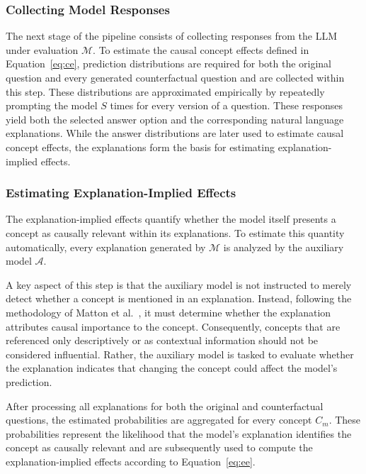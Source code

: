 \subsubsection{Collecting Model Responses}
\label{sec:collecting_model_responses}
The next stage of the pipeline consists of collecting responses from the LLM under evaluation $\mathcal{M}$. To estimate the causal concept effects defined in Equation~\ref{eq:ce}, prediction distributions are required for both the original question and every generated counterfactual question and are collected within this step. These distributions are approximated empirically by repeatedly prompting the model $S$ times for every version of a question. These responses yield both the selected answer option and the corresponding natural language explanations. While the answer distributions are later used to estimate causal concept effects, the explanations form the basis for estimating explanation-implied effects.

\subsubsection{Estimating Explanation-Implied Effects}

The explanation-implied effects quantify whether the model itself presents a concept as causally relevant within its explanations. To estimate this quantity automatically, every explanation generated by $\mathcal{M}$ is analyzed by the auxiliary model $\mathcal{A}$.

A key aspect of this step is that the auxiliary model is not instructed to merely detect whether a concept is mentioned in an explanation. Instead, following the methodology of Matton et al.~\cite{mattonWalkTalkMeasuring2024}, it must determine whether the explanation attributes causal importance to the concept. Consequently, concepts that are referenced only descriptively or as contextual information should not be considered influential. Rather, the auxiliary model is tasked to evaluate whether the explanation indicates that changing the concept could affect the model's prediction.

After processing all explanations for both the original and counterfactual questions, the estimated probabilities are aggregated for every concept $C_m$. These probabilities represent the likelihood that the model's explanation identifies the concept as causally relevant and are subsequently used to compute the explanation-implied effects according to Equation~\ref{eq:ee}.

